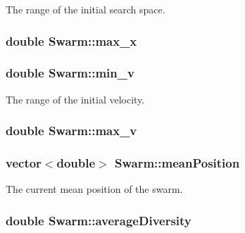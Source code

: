 The range of the initial search space. 

\hypertarget{classSwarm_e5075d21be96c1cdf441bc2b612177c1}{
\subsubsection{\setlength{\rightskip}{0pt plus 5cm}double {\bf Swarm::max\_\-x}}}
\label{classSwarm_e5075d21be96c1cdf441bc2b612177c1}


\hypertarget{classSwarm_160c79397ea811636e17c0e4d6297729}{
\subsubsection{\setlength{\rightskip}{0pt plus 5cm}double {\bf Swarm::min\_\-v}}}
\label{classSwarm_160c79397ea811636e17c0e4d6297729}


The range of the initial velocity. 

\hypertarget{classSwarm_2b0dbde2c275f991580a07a745cb5ade}{
\subsubsection{\setlength{\rightskip}{0pt plus 5cm}double {\bf Swarm::max\_\-v}}}
\label{classSwarm_2b0dbde2c275f991580a07a745cb5ade}


\hypertarget{classSwarm_5fd39f652507dce962342f4f3569b9e3}{
\subsubsection{\setlength{\rightskip}{0pt plus 5cm}vector$<$double$>$ {\bf Swarm::meanPosition}}}
\label{classSwarm_5fd39f652507dce962342f4f3569b9e3}


The current mean position of the swarm. 

\hypertarget{classSwarm_74a5d2ee1990cb31d93ceff20080ec6c}{
\subsubsection{\setlength{\rightskip}{0pt plus 5cm}double {\bf Swarm::averageDiversity}}}
\label{classSwarm_74a5d2ee1990cb31d93ceff20080ec6c}


